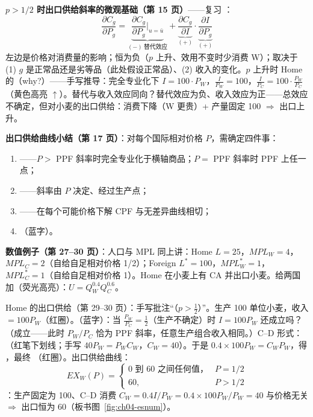 \textbf{$p > 1/2$ 时出口供给斜率的微观基础（第 15 页）}——复习 ：
\[
\frac{\partial C_g}{\partial P_g} = \underbrace{\frac{\partial C_g}{\partial P_g}\Big|_{u = \bar{u}}}_{(-)\ \text{替代效应}} + \underbrace{\frac{\partial C_g}{\partial I}}_{(+)} \cdot \underbrace{\frac{\partial I}{\partial P_g}}_{(+)}
\]
左边是价格对消费量的影响；恒为负（$p$ 上升、效用不变时少消费 W）；取决于 (1) $g$ 是正常品还是劣等品（此处假设正常品）、(2) 收入的变化。$p$ 上升时 Home 的（why?）——手写推导：完全专业化下 $I = 100 \cdot P_W$，$\frac{I}{P_W} = 100$，$\frac{I}{P_C} = 100 \cdot \frac{P_W}{P_C}$（黄色高亮 $\uparrow$）。替代与收入效应同向？替代效应为负、收入效应为正——总效应不确定，但对小麦的出口供给：消费下降（W 更贵）+ 产量固定 100 $\Rightarrow$ 出口上升。

\textbf{出口供给曲线小结（第 17 页）}：对每个国际相对价格 $P$，需确定四件事：
\begin{enumerate}
  \item {}——$P >$ PPF 斜率时完全专业化于横轴商品；$P =$ PPF 斜率时 PPF 上任一点；
  \item {}——斜率由 $P$ 决定、经过生产点；
  \item {}——在每个可能价格下解 CPF 与无差异曲线相切；
  \item {}（蓝字）。
\end{enumerate}

\textbf{数值例子（第 27--30 页）}：人口与 MPL 同上讲：Home $L = 25$，$MPL_W = 4$，$MPL_C = 2$（自给自足相对价格 1/2）；Foreign $L^* = 100$，$MPL^*_W = 1$，$MPL^*_C = 1$（自给自足相对价格 1）。Home 在小麦上有 CA 并出口小麦。给两国加（荧光高亮）：$U = Q_W^{0.4} Q_C^{0.6}$。

Home 的出口供给（第 29--30 页）：手写批注``（$p > \frac{1}{2}$）''。生产 100 单位小麦，收入 $= 100 P_W$（红圈）。（蓝字）：当 $\frac{P_W}{P_C} = \frac{1}{2}$（生产不确定）时 $I = 100 P_W$ 还成立吗？（成立——此时 $P_W/P_C$ 恰为 PPF 斜率，任意生产组合收入相同。）C--D 形式：（红笔下划线；手写 $40 P_W = P_W C_W$，$C_W = 40$）。于是 $0.4 \times 100 P_W = C_W P_W$，得 ，最终 （红圈）。出口供给曲线：
\[
EX_W(P) = \begin{cases} \text{0 到 60 之间任何值，} & P = 1/2 \\ 60, & P > 1/2 \end{cases}
\]
：生产固定为 100、C--D 消费 $C_W = 0.4 I / P_W = 0.4 \times 100 P_W / P_W = 40$ 与价格无关 $\Rightarrow$ 出口恒为 60（板书图~\ref{fig:ch04-esnum}）。

